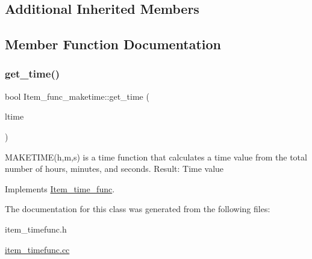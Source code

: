 \subsection*{Additional Inherited Members}


\subsection{Member Function Documentation}
\mbox{\label{classItem__func__maketime_adce1c69b807be74e21df99c158c84903}} 
\subsubsection{\texorpdfstring{get\+\_\+time()}{get\_time()}}
{\footnotesize\ttfamily bool Item\+\_\+func\+\_\+maketime\+::get\+\_\+time (\begin{DoxyParamCaption}\item[{M\+Y\+S\+Q\+L\+\_\+\+T\+I\+ME $\ast$}]{ltime }\end{DoxyParamCaption})\hspace{0.3cm}{\ttfamily [virtual]}}

M\+A\+K\+E\+T\+I\+M\+E(h,m,s) is a time function that calculates a time value from the total number of hours, minutes, and seconds. Result\+: Time value 

Implements \mbox{\hyperlink{classItem__time__func}{Item\+\_\+time\+\_\+func}}.



The documentation for this class was generated from the following files\+:\begin{DoxyCompactItemize}
\item 
item\+\_\+timefunc.\+h\item 
\mbox{\hyperlink{item__timefunc_8cc}{item\+\_\+timefunc.\+cc}}\end{DoxyCompactItemize}
